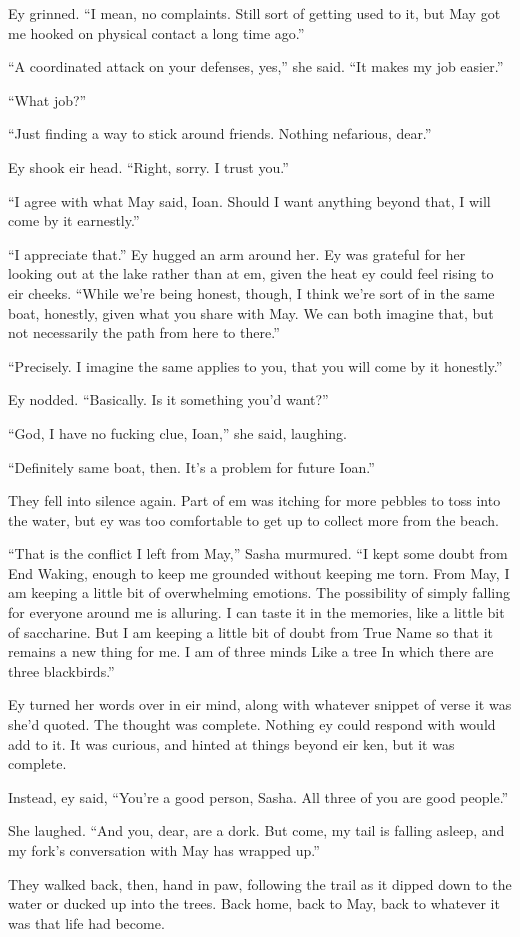 Ey grinned. ``I mean, no complaints. Still sort of getting used to it, but May got me hooked on physical contact a long time ago.''

``A coordinated attack on your defenses, yes,'' she said. ``It makes my job easier.''

``What job?''

``Just finding a way to stick around friends. Nothing nefarious, dear.''

Ey shook eir head. ``Right, sorry. I trust you.''

``I agree with what May said, Ioan. Should I want anything beyond that, I will come by it earnestly.''

``I appreciate that.'' Ey hugged an arm around her. Ey was grateful for her looking out at the lake rather than at em, given the heat ey could feel rising to eir cheeks. ``While we're being honest, though, I think we're sort of in the same boat, honestly, given what you share with May. We can both imagine that, but not necessarily the path from here to there.''

``Precisely. I imagine the same applies to you, that you will come by it honestly.''

Ey nodded. ``Basically. Is it something you'd want?''

``God, I have no fucking clue, Ioan,'' she said, laughing.

``Definitely same boat, then. It's a problem for future Ioan.''

They fell into silence again. Part of em was itching for more pebbles to toss into the water, but ey was too comfortable to get up to collect more from the beach.

``That is the conflict I left from May,'' Sasha murmured. ``I kept some doubt from End Waking, enough to keep me grounded without keeping me torn. From May, I am keeping a little bit of overwhelming emotions. The possibility of simply falling for everyone around me is alluring. I can taste it in the memories, like a little bit of saccharine. But I am keeping a little bit of doubt from True Name so that it remains a new thing for me. I am of three minds Like a tree In which there are three blackbirds.''

Ey turned her words over in eir mind, along with whatever snippet of verse it was she'd quoted. The thought was complete. Nothing ey could respond with would add to it. It was curious, and hinted at things beyond eir ken, but it was complete.

Instead, ey said, ``You're a good person, Sasha. All three of you are good people.''

She laughed. ``And you, dear, are a dork. But come, my tail is falling asleep, and my fork's conversation with May has wrapped up.''

They walked back, then, hand in paw, following the trail as it dipped down to the water or ducked up into the trees. Back home, back to May, back to whatever it was that life had become.
